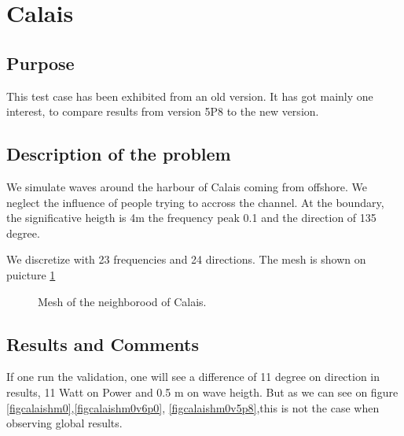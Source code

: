 \section{Calais}
%
%
\subsection{Purpose}
%
This test case has been exhibited from an old version. It has got mainly one interest, to compare results from version 5P8 to the new version.  

%
\subsection{Description of the problem}
We simulate waves around the harbour of Calais coming from offshore. We neglect the influence of people trying to accross the channel.
At the boundary, the significative heigth is 4m the frequency peak 0.1 and the direction of 135 degree.

We discretize with 23 frequencies and 24 directions. The mesh is shown on puicture \ref{figcalaismesh}

\begin{figure} [!h]
\centering
{}
 \caption{Mesh of the neighborood of Calais. }
\label{figcalaismesh}
\end{figure}

\subsection{Results and Comments}

If one run the validation, one will see a difference of 11 degree on direction in results, 11 Watt on Power and 0.5 m on wave heigth. But as we can see on figure  \ref{figcalaishm0},\ref{figcalaishm0v6p0}, \ref{figcalaishm0v5p8},this is not the case when observing global results.

